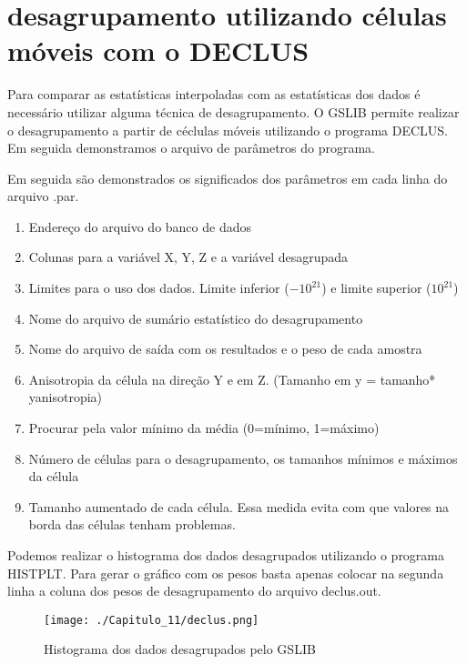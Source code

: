 \section{desagrupamento utilizando células móveis com o DECLUS}

Para comparar as estatísticas interpoladas com as estatísticas dos dados é necessário utilizar alguma técnica de desagrupamento. O GSLIB permite realizar o desagrupamento a partir de céclulas móveis utilizando o programa DECLUS. Em seguida demonstramos o arquivo de parâmetros do programa.

\begin{small}
	\begingroup
	
	\endgroup
\end{small}

Em seguida são demonstrados os significados dos parâmetros em cada linha do arquivo .par.

\begin{enumerate}
	\item Endereço do arquivo do banco de dados 
	\item Colunas para a variável X, Y, Z e a variável desagrupada 
	\item Limites para o uso dos dados. Limite inferior ($-10 ^{21} $) e limite superior ($10 ^{21} $)
	\item Nome do arquivo de sumário estatístico do desagrupamento 
	\item Nome do arquivo de saída com os resultados e o peso de cada amostra
	\item Anisotropia da célula na direção Y e em Z. (Tamanho em y = tamanho* yanisotropia)
	\item Procurar pela valor mínimo da média (0=mínimo, 1=máximo)
	\item Número de células para o desagrupamento, os tamanhos mínimos e máximos da célula
	\item Tamanho aumentado de cada célula. Essa medida evita com que valores na borda das células tenham problemas.
\end{enumerate}

Podemos realizar o histograma dos dados desagrupados utilizando o programa HISTPLT. Para gerar o gráfico com os pesos basta apenas colocar na segunda linha a coluna dos pesos de desagrupamento do arquivo declus.out. 

\FloatBarrier
\begin{figure}[h]
	\centering
	\texttt{[image: ./Capitulo\_11/declus.png]}	
	\caption{ Histograma dos dados desagrupados pelo GSLIB}
	\label{declus}
\end{figure}
\FloatBarrier

